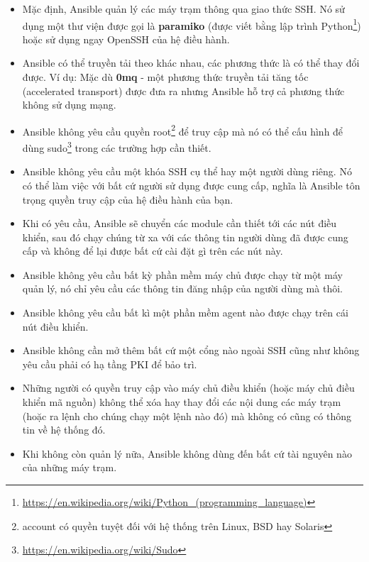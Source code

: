 \begin{itemize}
\item Mặc định, Ansible quản lý các máy trạm thông qua giao thức SSH. Nó sử dụng một thư viện được gọi là \textbf{paramiko} (được viết bằng lập trình Python\footnote{\url{https://en.wikipedia.org/wiki/Python_(programming_language)}}) hoặc sử dụng ngay OpenSSH của hệ điều hành.

\item Ansible có thể truyền tải theo khác nhau, các phương thức là có thể thay đổi được. Ví dụ: Mặc dù \textbf{0mq} - một phương thức truyền tải tăng tốc (accelerated transport) được đưa ra nhưng Ansible hỗ trợ cả phương thức không sử dụng mạng.

\item Ansible không yêu cầu quyền root\footnote{account có quyền tuyệt đối với hệ thống trên Linux, BSD hay Solaris} để truy cập mà nó có thể cấu hình để dùng sudo\footnote{\url{https://en.wikipedia.org/wiki/Sudo}} trong các trường hợp cần thiết.

\item Ansible không yêu cầu một khóa SSH cụ thể hay một người dùng riêng. Nó có thể làm việc với bất cứ người sử dụng được cung cấp, nghĩa là Ansible tôn trọng quyền truy cập của hệ điều hành của bạn.

\item Khi có yêu cầu, Ansible sẽ chuyển các module cần thiết tới các nút điều khiển, sau đó chạy chúng từ xa với các thông tin người dùng đã được cung cấp và không để lại được bất cứ cài đặt gì trên các nút này.

\item Ansible không yêu cầu bất kỳ phần mềm máy chủ được chạy từ một máy quản lý, nó chỉ yêu cầu các thông tin đăng nhập của người dùng mà thôi.

\item Ansible không yêu cầu bất kì một phần mềm agent nào được chạy trên cái nút điều khiển.

\item Ansible không cần mở thêm bất cứ một cổng nào ngoài SSH cũng như không yêu cầu phải có hạ tầng PKI để bảo trì.

\item Những người có quyền truy cập vào máy chủ điều khiển (hoặc máy chủ điều khiển mã nguồn) không thể xóa hay thay đổi các nội dung các máy trạm (hoặc ra lệnh cho chúng chạy một lệnh nào đó) mà không có cũng có thông tin về hệ thống đó.

\item Khi không còn quản lý nữa, Ansible không dùng đến bất cứ tài nguyên nào của những máy trạm.

\end{itemize}

